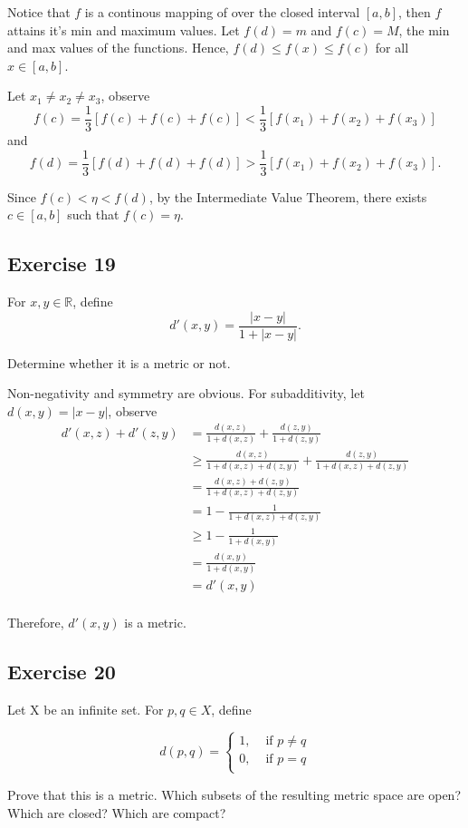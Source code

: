 \documentclass{tufte-book}
\theoremstyle{mytheoremstyle}
\theoremstyle{mylemstyle}
\theoremstyle{mydefstyle}
\begin{document}
Notice that $f$ is a continous mapping of over the closed interval $[a,b]$, then $f$ attains it's min and maximum values.  Let $f(d) = m$ and $f(c) = M$, the min and max values of the functions.  Hence, $f(d) \leq f(x) \leq f(c)$ for all $x \in [a,b]$.

Let $x_1 \neq x_2 \neq x_3$, observe
\[ f(c) = \frac{1}{3}[ f(c) + f(c) + f(c) ] < \frac{1}{3}[ f(x_1) + f(x_2) + f(x_3)] \]
and
\[ f(d) = \frac{1}{3}[ f(d) + f(d) + f(d) ] > \frac{1}{3}[ f(x_1) + f(x_2) + f(x_3)]. \]

Since $f(c) < \eta < f(d)$, by the Intermediate Value Theorem, there exists $c \in [a,b]$ such that $f(c) = \eta$.

\subsection{Exercise 19}
For $x,y \in \mathbb{R}$, define
\[ d'(x,y) = \frac{|x-y|}{1+|x-y|}. \]

Determine whether it is a metric or not.

Non-negativity and symmetry are obvious. For subadditivity, let $d(x,y)=|x-y|$, observe
\begin{align*}
d'(x,z) + d'(z,y) &= \frac{d(x,z)}{1+d(x,z)} + \frac{d(z,y)}{1+d(z,y)}\\
&\geq \frac{d(x,z)}{1+d(x,z) + d(z,y)} + \frac{d(z,y)}{1+d(x,z)+d(z,y)}\\
&= \frac{d(x,z) + d(z,y)}{1+d(x,z) + d(z,y)}\\
&= 1 - \frac{1}{1+d(x,z) + d(z,y)}\\
&\geq 1 - \frac{1}{1+d(x,y)}\\
&= \frac{d(x,y)}{1+d(x,y)}\\
&= d'(x,y)\\
\end{align*}

Therefore, $d'(x,y)$ is a metric.

\subsection{Exercise 20}
Let X be an infinite set.  For $p,q \in X$, define

\[ d(p,q) =
\begin{cases}
1, & \text{ if } p \neq q \\
0, & \text{ if } p=q\\
\end{cases}
\]

Prove that this is a metric. Which subsets of the resulting metric space are open?  Which are closed?  Which are compact?
\end{document}
